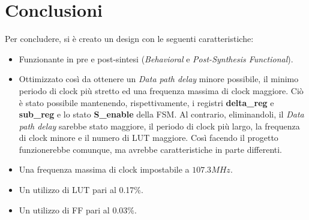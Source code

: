\documentclass{article}
\begin{document}
\section{Conclusioni}
Per concludere, si è creato un design con le seguenti caratteristiche:
\vspace{0.2cm}
\begin{itemize}
	\item Funzionante in pre e post-sintesi (\textit{Behavioral} e \textit{Post-Synthesis Functional}).
	\item Ottimizzato così da ottenere un \textit{Data path delay} minore possibile, il minimo periodo di clock più stretto ed una frequenza massima di clock maggiore. Ciò è stato possibile mantenendo, rispettivamente, i registri \textbf{delta\_reg} e \textbf{sub\_reg} e lo stato \textbf{S\_enable} della FSM. Al contrario, eliminandoli, il \textit{Data path delay} sarebbe stato maggiore, il periodo di clock più largo, la frequenza di clock minore e il numero di LUT maggiore. Così facendo il progetto funzionerebbe comunque, ma avrebbe caratteristiche in parte differenti.
	\item Una frequenza massima di clock impostabile a $107.3 \mathit{MHz}$.
	\item Un utilizzo di LUT pari al 0.17\%.
	\item Un utilizzo di FF pari al 0.03\%.
\end{itemize}
\end{document}
